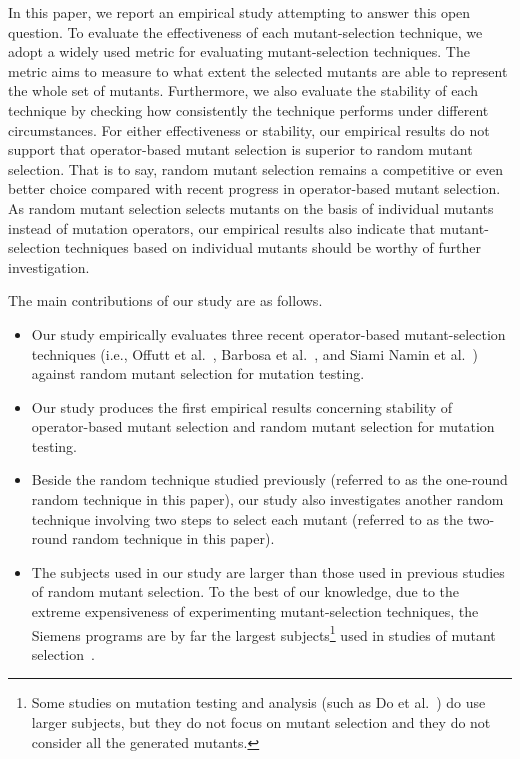 In this paper, we report an empirical study attempting to answer
this open question. To evaluate the effectiveness of each
mutant-selection technique, we adopt a widely used metric for
evaluating mutant-selection techniques. The metric aims to measure
to what extent the selected mutants are able to represent the
whole set of mutants. Furthermore, we also evaluate the stability
of each technique by checking how consistently the technique
performs under different circumstances. For either effectiveness
or stability, our empirical results do not support that
operator-based mutant selection is superior to random mutant
selection. That is to say, random mutant selection remains a
competitive or even better choice compared with recent progress in
operator-based mutant selection. As random mutant selection
selects mutants on the basis of individual mutants instead of
mutation operators, our empirical results also indicate that
mutant-selection techniques based on individual mutants should be
worthy of further investigation.

The main contributions of our study are as follows.


\begin{itemize}
\vspace{-2ex}

\item Our study empirically evaluates three recent operator-based
mutant-selection techniques (i.e., Offutt et al.~\cite{Offutt:96},
Barbosa et al.~\cite{Barbosa:01}, and Siami Namin et
al.~\cite{SiamiNamin:08}) against random mutant selection for
mutation testing.\vspace{-2ex}

\item Our study produces the first empirical results concerning
stability of operator-based mutant selection and random mutant
selection for mutation testing. \vspace{-2ex}

\item Beside the random technique studied previously (referred to as
the one-round random technique in this paper), our study also
investigates another random technique involving two steps to select
each mutant (referred to as the two-round random technique in this
paper).\vspace{-2ex}

\item The subjects used in our study are larger than those used in
previous studies of random mutant selection. To the best of our
knowledge, due to the extreme expensiveness of experimenting
mutant-selection techniques, the Siemens programs are by far the
largest subjects\footnote{Some studies on mutation testing and
analysis (such as Do et al.~\cite{Do:06}) do use larger subjects,
but they do not focus on mutant selection and they do not consider
all the generated mutants.} used in studies of mutant
selection~\cite{SiamiNamin:08}. \vspace{-2ex}

\end{itemize}

